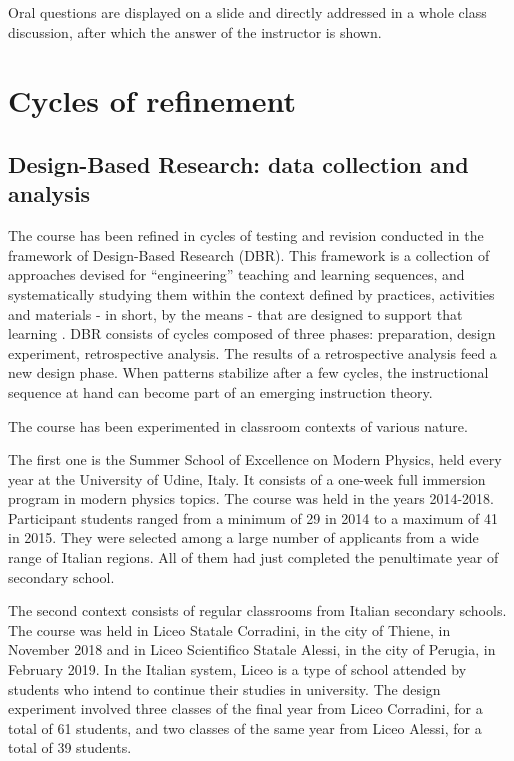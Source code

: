 \documentclass[twocolumn,secnumarabic,amssymb, nobibnotes, aps, prd, nofootinbib]{revtex4-2}
\begin{document}
Oral questions are displayed on a slide and directly addressed in a whole class discussion, after which the answer of the instructor is shown.

\section{Cycles of refinement} \label{Sec:5}

\subsection{Design-Based Research: data collection and analysis}

The course has been refined in cycles of testing and revision conducted in the framework of Design-Based Research (DBR). This framework is a collection of approaches devised for ``engineering'' teaching and learning sequences, and systematically studying them within the context defined by practices, activities and materials - in short, by the means - that are designed to support that learning \cite{Bakker2015}. DBR consists of cycles composed of three phases: preparation, design experiment, retrospective analysis. The results of a retrospective analysis feed a new design phase. When patterns stabilize after a few cycles, the instructional sequence at hand can become part of an emerging instruction theory.

The course has been experimented in classroom contexts of various nature.

The first one is the Summer School of Excellence on Modern Physics, held every year at the University of Udine, Italy. It consists of a one-week full immersion program in modern physics topics. The course was held in the years 2014-2018. Participant students ranged from a minimum of 29 in 2014 to a maximum of 41 in 2015. They were selected among a large number of applicants from a wide range of Italian regions. All of them had just completed the penultimate year of secondary school.

The second context consists of regular classrooms from Italian secondary schools. The course was held in Liceo Statale Corradini, in the city of Thiene, in November 2018 and in Liceo Scientifico Statale Alessi, in the city of Perugia, in February 2019. In the Italian system, Liceo is a type of school attended by students who intend to continue their studies in university. The design experiment involved three classes of the final year from Liceo Corradini, for a total of 61 students, and two classes of the same year from Liceo Alessi, for a total of 39 students.
\end{document}
